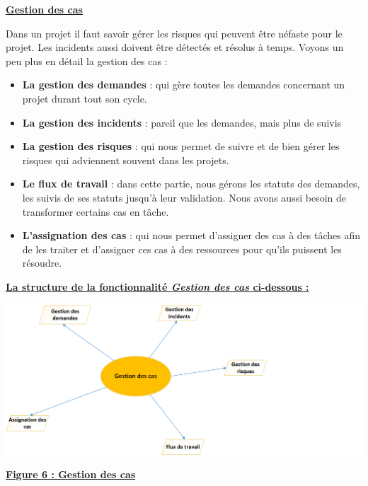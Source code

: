 \documentclass[11pt]{report}
\begin{document}
\newpage
\begin{center}
\underline{\textbf{Gestion des cas}} 
\end{center}

\hspace{1cm} Dans un projet il faut savoir gérer les risques qui peuvent être néfaste pour le projet. Les incidents aussi doivent être détectés et résolus à temps. Voyons un peu plus en détail la gestion des cas : 
\begin{itemize}
	\item \textbf{La gestion des demandes} : qui gère toutes les demandes concernant un projet durant tout son cycle.

	\item \textbf{La gestion des incidents} : pareil que les demandes, mais plus de suivis
	
	\item \textbf{La gestion des risques} : qui nous permet de suivre et de bien gérer les risques qui adviennent souvent dans les projets.

	\item \textbf{Le flux de travail} : dans cette partie, nous gérons les statuts des demandes, les suivis de ses statuts jusqu’à leur validation. Nous avons aussi besoin de transformer certains cas en tâche.

	\item \textbf{L’assignation des cas} : qui nous permet d’assigner des cas à des tâches afin de les traiter et d’assigner ces cas à des ressources pour qu’ils puissent les résoudre.
\end{itemize}

\begin{center}
\underline{\textbf{La structure de la fonctionnalité \textit{Gestion des cas} ci-dessous :}}
\end{center}
\begin{center}
\includegraphics[scale=0.7]{images/figure6.png} 
\quad

\underline{\textbf{Figure 6 : Gestion des cas}}
\end{center}
\quad
\end{document}

